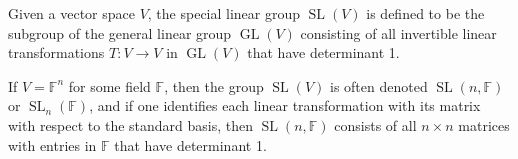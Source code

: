 \documentclass[12pt]{article}
\newcommand{\SL}{{\operatorname{SL}}}
\begin{document}
Given a vector space $V$, the special linear group $\SL(V)$ is defined to be the subgroup of the general linear group $\operatorname{GL}(V)$ consisting of all invertible linear transformations $T: V \longrightarrow V$ in $\operatorname{GL}(V)$ that have determinant 1.

If $V = \mathbb{F}^n$ for some field $\mathbb{F}$, then the group $\SL(V)$ is often denoted $\SL(n,\mathbb{F})$ or $\SL_n(\mathbb{F})$, and if one identifies each linear transformation with its matrix with respect to the standard basis, then $\SL(n,\mathbb{F})$ consists of all $n \times n$ matrices with entries in $\mathbb{F}$ that have determinant 1.
\end{document}

